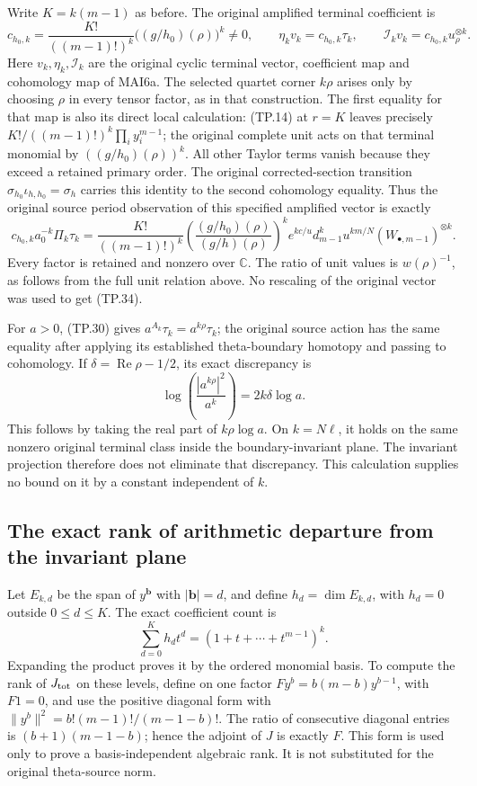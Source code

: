 Write \(K=k(m-1)\) as before. The original amplified terminal
coefficient is
\[
 c_{h_0,k}=\frac{K!}{((m-1)!)^k}
             \bigl((g/h_0)(\rho)\bigr)^k\ne0,
 \qquad \eta_k v_k=c_{h_0,k}\tau_k,
 \qquad \mathcal I_kv_k=c_{h_0,k}u_\rho^{\otimes k}.
 \tag{TP.33}\label{CFStage:eq:tp-MAIscalar}
\]
Here \(v_k,\eta_k,\mathcal I_k\) are the original cyclic
terminal vector, coefficient map and cohomology map of MAI6a.
The selected quartet corner \(k\rho\) arises only by choosing
\(\rho\) in every tensor factor, as in that construction.
The first equality for that map is also its direct local
calculation: (TP.14) at \(r=K\) leaves precisely
\(K!/((m-1)!)^k\prod_i y_i^{m-1}\); the original complete unit
acts on that terminal monomial by \(((g/h_0)(\rho))^k\).
All other Taylor terms vanish because they exceed a retained
primary order. The original corrected-section transition
\(\sigma_{h_0}\iota_{h,h_0}=\sigma_h\) carries this identity
to the second cohomology equality. Thus the original source
period observation of this specified amplified vector is
exactly
\[
 c_{h_0,k}a_0^{-k}\Pi_k\tau_k
 =\frac{K!}{((m-1)!)^k}
       \left(\frac{(g/h_0)(\rho)}{(g/h)(\rho)}\right)^k
       e^{kc/u}d_{m-1}^k u^{km/N}(W_{\bullet,m-1})^{\otimes k}.
 \tag{TP.34}\label{CFStage:eq:tp-MAIperiod}
\]
Every factor is retained and nonzero over \(\mathbb C\).
The ratio of unit values is \(w(\rho)^{-1}\), as follows
from the full unit relation above. No rescaling of the
original vector was used to get (TP.34).

For \(a>0\), (TP.30) gives
\(a^{A_k}\tau_k=a^{k\rho}\tau_k\); the original source
action has the same equality after applying its established
theta-boundary homotopy and passing to cohomology. If
\(\delta=\operatorname{Re}\rho-1/2\), its exact discrepancy is
\[
 \log\!\left(\frac{|a^{k\rho}|^2}{a^k}\right)
        =2k\delta\log a.
 \tag{TP.35}\label{CFStage:eq:tp-terminaldiscrepancy}
\]
This follows by taking the real part of \(k\rho\log a\).
On \(k=N\ell\), it holds on the same nonzero original
terminal class inside the boundary-invariant plane.
The invariant projection therefore does not eliminate
that discrepancy. This calculation supplies no bound
on it by a constant independent of \(k\).

\subsection{The exact rank of arithmetic departure from the invariant plane}

Let \(E_{k,d}\) be the span of \(y^{\mathbf b}\) with
\(|\mathbf b|=d\), and define \(h_d=\dim E_{k,d}\), with
\(h_d=0\) outside \(0\leq d\leq K\). The exact coefficient
count is
\[
 \sum_{d=0}^K h_d t^d=(1+t+\cdots+t^{m-1})^k.
 \tag{TP.36}\label{CFStage:eq:tp-hilbert}
\]
Expanding the product proves it by the ordered monomial
basis. To compute the rank of \(J_{\rm tot}\) on these
levels, define on one factor
\(Fy^b=b(m-b)y^{b-1}\), with \(F1=0\), and use the
positive diagonal form with
\(\|y^b\|^2=b!(m-1)!/(m-1-b)!\).
The ratio of consecutive diagonal entries is
\((b+1)(m-1-b)\); hence the adjoint of \(J\) is exactly
\(F\). This form is used only to prove a basis-independent
algebraic rank. It is not substituted for the original
theta-source norm.

